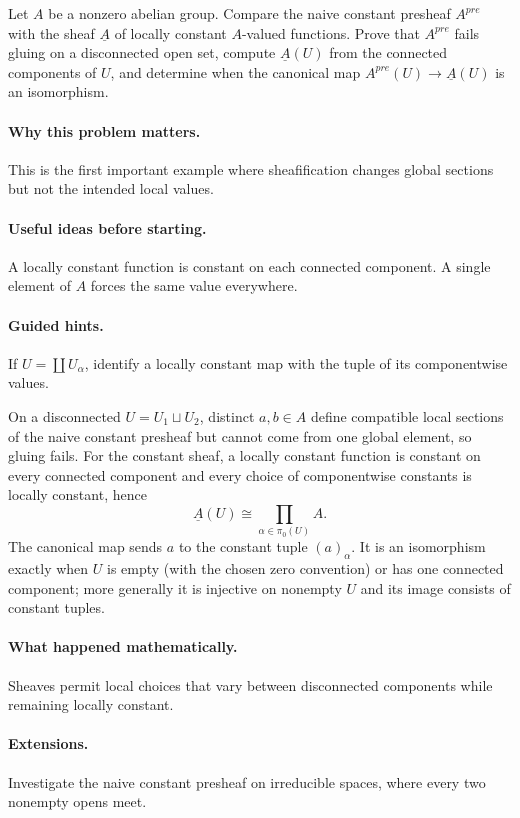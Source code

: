 \begin{problem}
Let $A$ be a nonzero abelian group. Compare the naive constant presheaf $A^{pre}$ with the sheaf $\underline A$ of locally constant $A$-valued functions. Prove that $A^{pre}$ fails gluing on a disconnected open set, compute $\underline A(U)$ from the connected components of $U$, and determine when the canonical map $A^{pre}(U)\to\underline A(U)$ is an isomorphism.
\end{problem}

\paragraph{Why this problem matters.}
This is the first important example where sheafification changes global sections but not the intended local values.

\paragraph{Useful ideas before starting.}
A locally constant function is constant on each connected component. A single element of $A$ forces the same value everywhere.

\paragraph{Guided hints.}
If $U=\coprod U_\alpha$, identify a locally constant map with the tuple of its componentwise values.

\ifdefined\FullProblemDossiers
\begin{solution}
On a disconnected $U=U_1\sqcup U_2$, distinct $a,b\in A$ define compatible local sections of the naive constant presheaf but cannot come from one global element, so gluing fails. For the constant sheaf, a locally constant function is constant on every connected component and every choice of componentwise constants is locally constant, hence
\[
\underline A(U)\cong\prod_{\alpha\in\pi_0(U)}A.
\]
The canonical map sends $a$ to the constant tuple $(a)_\alpha$. It is an isomorphism exactly when $U$ is empty (with the chosen zero convention) or has one connected component; more generally it is injective on nonempty $U$ and its image consists of constant tuples.
\end{solution}

\paragraph{What happened mathematically.}
Sheaves permit local choices that vary between disconnected components while remaining locally constant.

\paragraph{Extensions.}
Investigate the naive constant presheaf on irreducible spaces, where every two nonempty opens meet.
\fi
